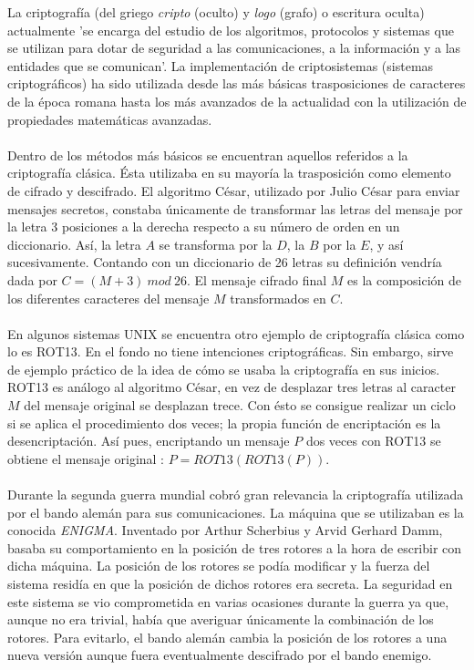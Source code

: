 \documentclass[../PFC.tex]{subfiles}
\begin{document}
La criptografía (del griego \textit{cripto} (oculto) y \textit{logo} (grafo) o escritura oculta) actualmente 'se encarga del estudio de los algoritmos, protocolos y sistemas que se utilizan para dotar de seguridad a las comunicaciones, a la información y a las entidades que se comunican'\cite{pastor1998criptografia}. La implementación de criptosistemas (sistemas criptográficos) ha sido utilizada desde las más básicas trasposiciones de caracteres de la época romana hasta los más avanzados de la actualidad con la utilización de propiedades matemáticas avanzadas.
\\\\
Dentro de los métodos más básicos se encuentran aquellos referidos a la criptografía clásica. Ésta utilizaba en su mayoría la trasposición como elemento de cifrado y descifrado. El algoritmo César, utilizado por Julio César para enviar mensajes secretos\cite{lucena}, constaba únicamente de transformar las letras del mensaje por la letra 3 posiciones a la derecha respecto a su número de orden en un diccionario. Así, la letra $A$ se transforma por la $D$, la $B$ por la $E$, y así sucesivamente. Contando con un diccionario de 26 letras su definición vendría dada por $C= (M + 3)\  mod\ 26$. El mensaje cifrado final $M$ es la composición de los diferentes caracteres del mensaje $M$ transformados en $C$.
\\\\
En algunos sistemas UNIX se encuentra otro ejemplo de criptografía clásica como lo es ROT13. En el fondo no tiene intenciones criptográficas. Sin embargo, sirve de ejemplo práctico de la idea de cómo se usaba la criptografía en sus inicios. ROT13 es análogo al algoritmo César, en vez de desplazar tres letras al caracter $M$ del mensaje original se desplazan trece. Con ésto se consigue realizar un ciclo si se aplica el procedimiento dos veces; la propia función de encriptación es la desencriptación. Así pues, encriptando un mensaje $P$ dos veces con ROT13 se obtiene el mensaje original : $P = ROT13 (ROT13 (P))$.
\\\\
Durante la segunda guerra mundial cobró gran relevancia la criptografía utilizada por el bando alemán para sus comunicaciones. La máquina que se utilizaban es la conocida \textit{ENIGMA}. Inventado por Arthur Scherbius y Arvid Gerhard Damm\cite{bruce}, basaba su comportamiento en la posición de tres rotores a la hora de escribir con dicha máquina. La posición de los rotores se podía modificar y la fuerza del sistema residía en que la posición de dichos rotores era secreta. La seguridad en este sistema se vio comprometida en varias ocasiones durante la guerra ya que, aunque no era trivial, había que averiguar únicamente la combinación de los rotores. Para evitarlo, el bando alemán cambia la posición de los rotores a una nueva versión aunque fuera eventualmente descifrado por el bando enemigo.
\end{document}
